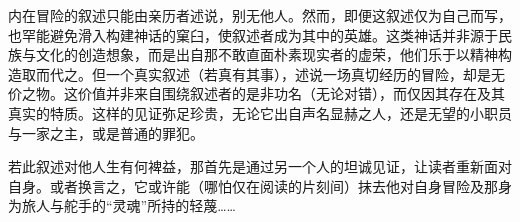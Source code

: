内在冒险的叙述只能由亲历者述说，别无他人。然而，即便这叙述仅为自己而写，也罕能避免滑入构建神话的窠臼，使叙述者成为其中的英雄。这类神话并非源于民族与文化的创造想象，而是出自那不敢直面朴素现实者的虚荣，他们乐于以精神构造取而代之。但一个真实叙述（若真有其事），述说一场真切经历的冒险，却是无价之物。这价值并非来自围绕叙述者的是非功名（无论对错），而仅因其存在及其真实的特质。这样的见证弥足珍贵，无论它出自声名显赫之人，还是无望的小职员与一家之主，或是普通的罪犯。

若此叙述对他人生有何裨益，那首先是通过另一个人的坦诚见证，让读者重新面对自身。或者换言之，它或许能（哪怕仅在阅读的片刻间）抹去他对自身冒险及那身为旅人与舵手的“灵魂”所持的轻蔑……
